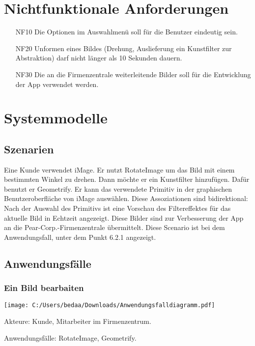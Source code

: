 \documentclass[parskip=full]{scrartcl}
\begin{document}
\section{Nichtfunktionale Anforderungen}
\begin{itemize}[nosep]
\item[NF10] Die Optionen im Auswahlmenü soll für die Benutzer eindeutig sein.
\item[NF20] Unformen eines Bildes (Drehung,  Auslieferung ein \gls{Kunstfilter} zur Abstraktion) darf nicht länger als 10 Sekunden dauern.
\item[NF30] Die an die Firmenzentrale weiterleitende Bilder soll  für die Entwicklung der App verwendet werden.
\end{itemize}

\section{Systemmodelle}

\subsection{Szenarien}
Eine Kunde verwendet iMage. Er nutzt RotateImage um das Bild mit einem bestimmten Winkel  zu drehen. Dann möchte er ein Kunstfilter hinzufügen. Dafür benutzt er Geometrify. Er kann das verwendete Primitiv  in der graphischen Benutzeroberfläche von iMage auswählen. Diese Assoziationen sind bidirektional: Nach der Auswahl des Primitivs ist eine Vorschau des Filtereffektes für das aktuelle Bild in Echtzeit angezeigt. Diese Bilder sind zur Verbesserung der App an die Pear-Corp.-Firmenzentrale übermittelt. Diese Scenario ist bei dem Anwendungsfall, unter dem Punkt 6.2.1 angezeigt.

\subsection{Anwendungsfälle}
\subsubsection{Ein Bild bearbaiten}
\begin{center}
\texttt{[image: C:/Users/bedaa/Downloads/Anwendungsfalldiagramm.pdf]}
\end{center}

Akteure: Kunde, Mitarbeiter im Firmenzentrum.

Anwendungsfälle: RotateImage, Geometrify.
\end{document}
